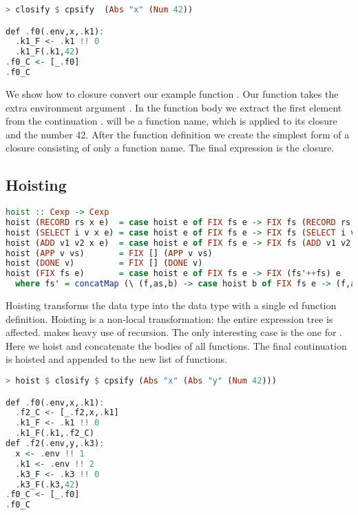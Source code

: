 \begin{lstlisting}[language=Haskell]
> closify $ cpsify  (Abs "x" (Num 42))

def .f0(.env,x,.k1):
  .k1_F <- .k1 !! 0
  .k1_F(.k1,42)
.f0_C <- [_.f0]
.f0_C
\end{lstlisting}

We show how to closure convert our example function . Our function  takes the extra environment argument . In the function body we extract the first element from the continuation .  will be a function name, which is applied to its closure and the number 42. After the function definition we create the simplest form of a closure consisting of only a function name. The final expression is the closure.

\subsection{\label{subsection:hoist}Hoisting}
\begin{lstlisting}[language=Haskell]
hoist :: Cexp -> Cexp
hoist (RECORD rs x e)  = case hoist e of FIX fs e -> FIX fs (RECORD rs x e)
hoist (SELECT i v x e) = case hoist e of FIX fs e -> FIX fs (SELECT i v x e)
hoist (ADD v1 v2 x e)  = case hoist e of FIX fs e -> FIX fs (ADD v1 v2 x e)
hoist (APP v vs)       = FIX [] (APP v vs)
hoist (DONE v)         = FIX [] (DONE v)               
hoist (FIX fs e)       = case hoist e of FIX fs e -> FIX (fs'++fs) e
  where fs' = concatMap (\ (f,as,b) -> case hoist b of FIX fs e -> (f,as,e) : fs) fs
\end{lstlisting}

Hoisting transforms the  data type into the  data type with a single ed function definition. Hoisting is a non-local transformation: the entire expression tree is affected.  makes heavy use of recursion. The only interesting case is the one for . Here we hoist and concatenate the bodies of all functions. The final continuation  is hoisted and appended to the new list of functions.

\begin{lstlisting}[language=Haskell]
> hoist $ closify $ cpsify (Abs "x" (Abs "y" (Num 42)))

def .f0(.env,x,.k1):
  .f2_C <- [_.f2,x,.k1]
  .k1_F <- .k1 !! 0
  .k1_F(.k1,.f2_C)
def .f2(.env,y,.k3):
  x <- .env !! 1
  .k1 <- .env !! 2
  .k3_F <- .k3 !! 0
  .k3_F(.k3,42)
.f0_C <- [_.f0]
.f0_C
\end{lstlisting}

